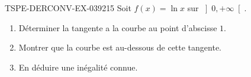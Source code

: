 \begin{exercice}{TSPE-DERCONV-EX-039}{2}{15}
Soit $f(x) = \ln x$ sur $\left]0, +\infty\right[$.
\begin{enumerate}
  \item Déterminer la tangente a la courbe au point d'abscisse $1$.
  \item Montrer que la courbe est au-dessous de cette tangente.
  \item En déduire une inégalité connue.
\end{enumerate}

\end{exercice}
